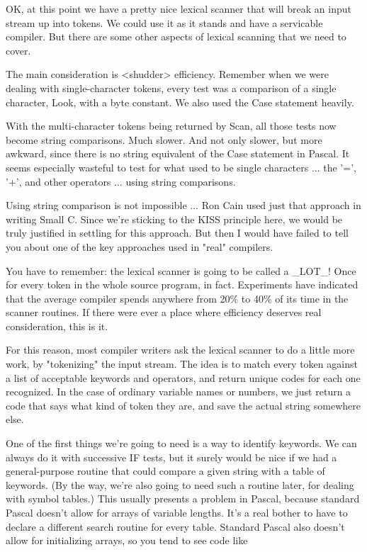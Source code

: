 \documentclass[float=false, crop=false]{standalone}
\begin{document}
OK, at this point we have a pretty nice lexical scanner that will break an input
stream up into tokens. We could use it as it stands and have a servicable
compiler. But there are some other aspects of lexical scanning that we need to
cover.

The main consideration is <shudder> efficiency. Remember when we were dealing
with single-character tokens, every test was a comparison of a single character,
Look, with a byte constant. We also used the Case statement heavily.

With the multi-character tokens being returned by Scan, all those tests now
become string comparisons. Much slower. And not only slower, but more awkward,
since there is no string equivalent of the Case statement in Pascal. It seems
especially wasteful to test for what used to be single characters ... the '=',
'+', and other operators ... using string comparisons.

Using string comparison is not impossible ... Ron Cain used just that approach
in writing Small C. Since we're sticking to the KISS principle here, we would be
truly justified in settling for this approach. But then I would have failed to
tell you about one of the key approaches used in "real" compilers.

You have to remember: the lexical scanner is going to be called a _LOT_! Once
for every token in the whole source program, in fact. Experiments have indicated
that the average compiler spends anywhere from 20\% to 40\% of its time in the
scanner routines. If there were ever a place where efficiency deserves real
consideration, this is it.

For this reason, most compiler writers ask the lexical scanner to do a little
more work, by "tokenizing" the input stream. The idea is to match every token
against a list of acceptable keywords and operators, and return unique codes for
each one recognized. In the case of ordinary variable names or numbers, we just
return a code that says what kind of token they are, and save the actual string
somewhere else.

One of the first things we're going to need is a way to identify keywords. We
can always do it with successive IF tests, but it surely would be nice if we had
a general-purpose routine that could compare a given string with a table of
keywords. (By the way, we're also going to need such a routine later, for
dealing with symbol tables.) This usually presents a problem in Pascal, because
standard Pascal doesn't allow for arrays of variable lengths. It's a real bother
to have to declare a different search routine for every table. Standard Pascal
also doesn't allow for initializing arrays, so you tend to see code like
\end{document}
